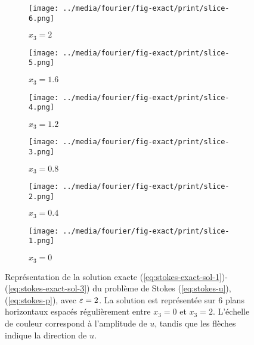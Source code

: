 \begin{figure}[h!]
  \begin{center}
    \begin{subfigure}[b]{0.49\textwidth}
      \texttt{[image: ../media/fourier/fig-exact/print/slice-6.png]}
      \caption{$x_3 = 2$}
    \end{subfigure}
    \begin{subfigure}[b]{0.49\textwidth}
      \texttt{[image: ../media/fourier/fig-exact/print/slice-5.png]}
      \caption{$x_3 = 1.6$}
    \end{subfigure}
    \begin{subfigure}[b]{0.49\textwidth}
      \texttt{[image: ../media/fourier/fig-exact/print/slice-4.png]}
      \caption{$x_3 = 1.2$}
    \end{subfigure}
    \begin{subfigure}[b]{0.49\textwidth}
      \texttt{[image: ../media/fourier/fig-exact/print/slice-3.png]}
      \caption{$x_3 = 0.8$}
    \end{subfigure}
    \begin{subfigure}[b]{0.49\textwidth}
      \texttt{[image: ../media/fourier/fig-exact/print/slice-2.png]}
      \caption{$x_3 = 0.4$}
    \end{subfigure}
    \begin{subfigure}[b]{0.49\textwidth}
      \texttt{[image: ../media/fourier/fig-exact/print/slice-1.png]}
      \caption{$x_3 = 0$}
    \end{subfigure}
    \caption{Représentation de la solution exacte
      (\ref{eq:stokes-exact-sol-1})-(\ref{eq:stokes-exact-sol-3}) du
      problème de Stokes (\ref{eq:stokes-u}), (\ref{eq:stokes-p}),
      avec $\varepsilon = 2$. La
      solution est représentée sur 6 plans horizontaux espacés
      régulièrement entre $x_3 = 0$ et $x_3 = 2$. L'échelle de couleur
      correspond à l'amplitude de $u$, tandis que les flèches indique
      la direction de $u$.}
    \label{fig:stokes-exact-sol}
  \end{center}
\end{figure}

